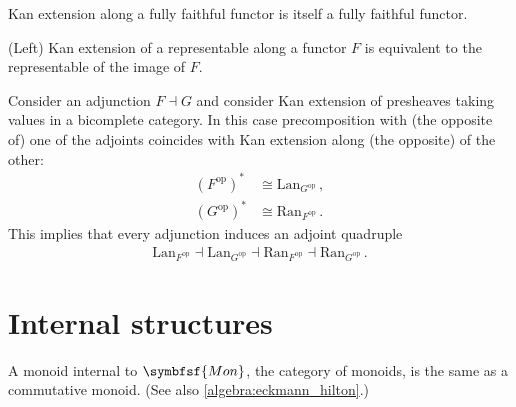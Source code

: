     \begin{property}[Faithfulness]
        Kan extension along a fully faithful functor is itself a fully faithful functor.
    \end{property}
    \begin{property}[Representability]
        (Left) Kan extension of a representable along a functor $F$ is equivalent to the representable of the image of $F$.
    \end{property}

    \begin{property}\label{cat:kan_quadruple}
        Consider an adjunction $F\dashv G$ and consider Kan extension of presheaves taking values in a bicomplete category. In this case precomposition with (the opposite of) one of the adjoints coincides with Kan extension along (the opposite) of the other:
        \begin{align}
            (F^{\text{op}})^* &\cong \mathrm{Lan}_{G^{\text{op}}}\,,\\
            (G^{\text{op}})^* &\cong \mathrm{Ran}_{F^{\text{op}}}\,.
        \end{align}
        This implies that every adjunction induces an adjoint quadruple
        \begin{gather}
            \mathrm{Lan}_{F^{\text{op}}}\dashv\mathrm{Lan}_{G^{\text{op}}}\dashv\mathrm{Ran}_{F^{\text{op}}}\dashv\mathrm{Ran}_{G^{\text{op}}}\,.
        \end{gather}
    \end{property}

\section{Internal structures}\label{section:internal_category_theory}

    \begin{property}\label{cat:eckmann_hilton}
        A monoid internal to $\symbfsf{Mon}$, the category of monoids, is the same as a commutative monoid. (See also \cref{algebra:eckmann_hilton}.)
    \end{property}

